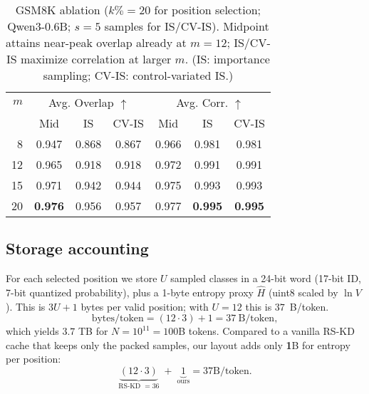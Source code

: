 \documentclass[11pt]{article}
\begin{document}
\vspace{-0.5em}
\begin{table}[h]
	\centering
	\small
	\setlength{\tabcolsep}{6pt}
	\begin{tabular}{rcccccc}
		\toprule
		$m$ & \multicolumn{3}{c}{Avg. Overlap $\uparrow$} & \multicolumn{3}{c}{Avg. Corr. $\uparrow$}                                                   \\
		\cmidrule(lr){2-4}\cmidrule(lr){5-7}
		    & Mid                                         & IS                                        & CV-IS & Mid   & IS             & CV-IS          \\
		\midrule
		8   & 0.947                                       & 0.868                                     & 0.867 & 0.966 & 0.981          & 0.981          \\
		12  & 0.965                                       & 0.918                                     & 0.918 & 0.972 & 0.991          & 0.991          \\
		15  & 0.971                                       & 0.942                                     & 0.944 & 0.975 & 0.993          & 0.993          \\
		20  & \textbf{0.976}                              & 0.956                                     & 0.957 & 0.977 & \textbf{0.995} & \textbf{0.995} \\
		\bottomrule
	\end{tabular}
	\caption{GSM8K ablation ($k\%{=}20$ for position selection; Qwen3-0.6B; $s{=}5$ samples for IS/CV-IS). Midpoint attains near-peak overlap already at $m{=}12$; IS/CV-IS maximize correlation at larger $m$. (IS: importance sampling; CV-IS: control-variated IS.)}
	\label{tab:entropy-ablation}
\end{table}
\vspace{-0.75em}

\subsection{Storage accounting}
For each selected position we store $U$ sampled classes in a 24-bit word (17-bit ID, 7-bit quantized probability), plus a 1-byte entropy proxy $\hat H$ (uint8 scaled by $\ln V$).
This is $3U+1$ bytes per valid position; with $U{=}12$ this is $37$~B/token.
\[
	\text{bytes/token} = (12 \cdot 3) + 1 = 37\ \text{B/token},
\]
which yields $3.7$ TB for $N{=}10^{11}{=}100$B tokens. Compared to a vanilla RS-KD cache that keeps only the packed samples, our layout adds only \textbf{1}B for entropy per position:
\[
	\underbrace{(12 \cdot 3)}_{\text{RS-KD }=36} \;+\; \underbrace{1}_{\text{ours}}
	= 37\text{B/token}.
\]
\end{document}
